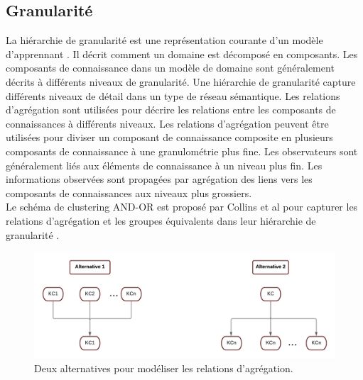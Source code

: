 \subsection{Granularité}
La hiérarchie de granularité est une représentation courante d'un modèle d'apprennant \cite{bayesian_networks_student_model_engineering}. Il décrit comment un domaine est décomposé en composants. Les composants de connaissance dans un modèle de domaine sont généralement décrits à différents niveaux de granularité. Une hiérarchie de granularité capture différents niveaux de détail dans un type de réseau sémantique. Les relations d'agrégation sont utilisées pour décrire les relations entre les composants de connaissances à différents niveaux. Les relations d'agrégation peuvent être utilisées pour diviser un composant de connaissance composite en plusieurs composants de connaissance à une granulométrie plus fine. Les observateurs sont généralement liés aux éléments de connaissance à un niveau plus fin. Les informations observées sont propagées par agrégation des liens vers les composants de connaissances aux niveaux plus grossiers.\\
Le schéma de clustering AND-OR est proposé par Collins et al pour capturer les relations d'agrégation et les groupes équivalents dans leur hiérarchie de granularité \cite{adaptive_assessment_using_granularity_hierarchies_and_bayesian_nets}.
\begin{figure}[H]
	\begin{center}
		\includegraphics[width=\textwidth]{images/chapitre2/Two_Aggregation_relationships.png}
	\end{center}
\caption{Deux alternatives pour modéliser les relations d'agrégation.}
\label{two_agregationrelationships}
\end{figure}

